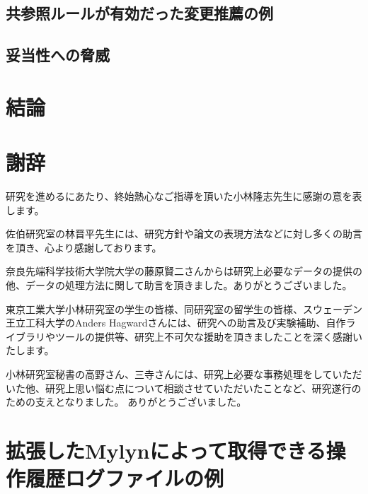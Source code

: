 \documentclass[a4paper]{jsbook}
\begin{document}
\section{共参照ルールが有効だった変更推薦の例}
\section{妥当性への脅威}

\chapter{結論}
\chapter*{謝辞}
研究を進めるにあたり、終始熱心なご指導を頂いた小林隆志先生に感謝の意を表します。

佐伯研究室の林晋平先生には、研究方針や論文の表現方法などに対し多くの助言を頂き、心より感謝しております。

奈良先端科学技術大学院大学の藤原賢二さんからは研究上必要なデータの提供の他、データの処理方法に関して助言を頂きました。ありがとうございました。

東京工業大学小林研究室の学生の皆様、同研究室の留学生の皆様、スウェーデン王立工科大学のAnders Hagwardさんには、研究への助言及び実験補助、自作ライブラリやツールの提供等、研究上不可欠な援助を頂きましたことを深く感謝いたします。

小林研究室秘書の高野さん、三寺さんには、研究上必要な事務処理をしていただいた他、研究上思い悩む点について相談させていただいたことなど、研究遂行のための支えとなりました。
ありがとうございました。

\appendix
\chapter{拡張したMylynによって取得できる操作履歴ログファイルの例}\label{mylyn_log_appendix}

\end{document}
